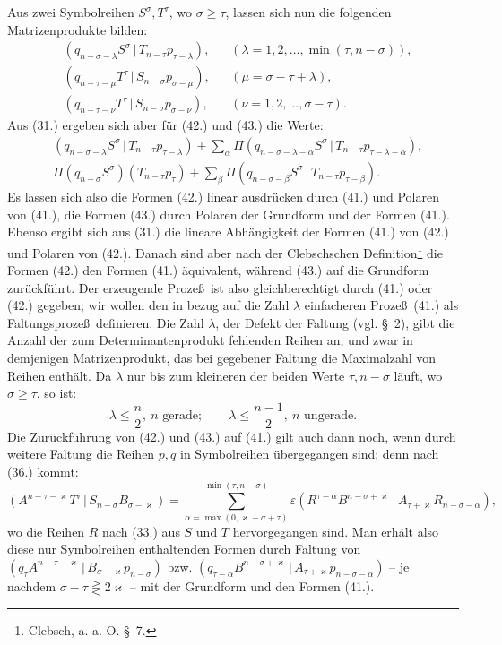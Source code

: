 \documentclass[11pt]{article}
\providecommand{\pair}[2]{(#1\,|\,#2)}
\providecommand{\eps}{\varepsilon}
\begin{document}
Aus zwei Symbolreihen $S^\sigma,T^\tau$, wo $\sigma\ge\tau$, lassen sich nun die folgenden Matrizenprodukte bilden:
\begin{align}
&\pair{q_{n-\sigma-\lambda}S^\sigma}{T_{n-\tau}p_{\tau-\lambda}}, &&(\lambda=1,2,\ldots,\min(\tau,n-\sigma)),\tag{41}\\
&\pair{q_{n-\tau-\mu}T^\tau}{S_{n-\sigma}p_{\sigma-\mu}}, &&(\mu=\sigma-\tau+\lambda),\tag{42}\\
&\pair{q_{n-\tau-\nu}T^\tau}{S_{n-\sigma}p_{\sigma-\nu}}, &&(\nu=1,2,\ldots,\sigma-\tau).
\tag{43}
\end{align}
Aus (31.) ergeben sich aber f\"ur (42.) und (43.) die Werte:
\begin{align}
&\pair{q_{n-\sigma-\lambda}S^\sigma}{T_{n-\tau}p_{\tau-\lambda}}
 +\sum_{\alpha}\Pi\pair{q_{n-\sigma-\lambda-\alpha}S^\sigma}{T_{n-\tau}p_{\tau-\lambda-\alpha}},\tag{42a}\\
&\Pi(q_{n-\sigma}S^\sigma)(T_{n-\tau}p_\tau)
 +\sum_{\beta}\Pi\pair{q_{n-\sigma-\beta}S^\sigma}{T_{n-\tau}p_{\tau-\beta}}.
\tag{43a}
\end{align}
Es lassen sich also die Formen (42.) linear ausdr\"ucken durch (41.) und Polaren von (41.), die Formen (43.) durch Polaren der Grundform und der Formen (41.). Ebenso ergibt sich aus (31.) die lineare Abh\"angigkeit der Formen (41.) von (42.) und Polaren von (42.). Danach sind aber nach der Clebschschen Definition\footnote{Clebsch, a. a. O. \S\ 7.} die Formen (42.) den Formen (41.) \"aquivalent, w\"ahrend (43.) auf die Grundform zur\"uckf\"uhrt. Der erzeugende Proze\ss\ ist also gleichberechtigt durch (41.) oder (42.) gegeben; wir wollen den in bezug auf die Zahl $\lambda$ einfacheren Proze\ss\ (41.) als Faltungsproze\ss\ definieren. Die Zahl $\lambda$, der Defekt der Faltung (vgl. \S\ 2), gibt die Anzahl der zum Determinantenprodukt fehlenden Reihen an, und zwar in demjenigen Matrizenprodukt, das bei gegebener Faltung die Maximalzahl von Reihen enth\"alt. Da $\lambda$ nur bis zum kleineren der beiden Werte $\tau,n-\sigma$ l\"auft, wo $\sigma\ge\tau$, so ist:
\begin{equation}
 \lambda\le\frac n2,\ n\text{ gerade};\qquad
 \lambda\le\frac{n-1}{2},\ n\text{ ungerade}.
\tag{44}
\end{equation}
Die Zur\"uckf\"uhrung von (42.) und (43.) auf (41.) gilt auch dann noch, wenn durch weitere Faltung die Reihen $p,q$ in Symbolreihen \"ubergegangen sind; denn nach (36.) kommt:
\[
 \pair{A^{n-\tau-\varkappa}T^\tau}{S_{n-\sigma}B_{\sigma-\varkappa}}
 =\sum_{\alpha=\max(0,\varkappa-\sigma+\tau)}^{\min(\tau,n-\sigma)}
 \eps\pair{R^{\tau-\alpha}B^{n-\sigma+\varkappa}}{A_{\tau+\varkappa}R_{n-\sigma-\alpha}},
\]
wo die Reihen $R$ nach (33.) aus $S$ und $T$ hervorgegangen sind. Man erh\"alt also diese nur Symbolreihen enthaltenden Formen durch Faltung von $\pair{q_\tau A^{n-\tau-\varkappa}}{B_{\sigma-\varkappa}p_{n-\sigma}}$ bzw. $\pair{q_{\tau-\alpha}B^{n-\sigma+\varkappa}}{A_{\tau+\varkappa}p_{n-\sigma-\alpha}}$ -- je nachdem $\sigma-\tau\gtreqless 2\varkappa$ -- mit der Grundform und den Formen (41.).
\end{document}
